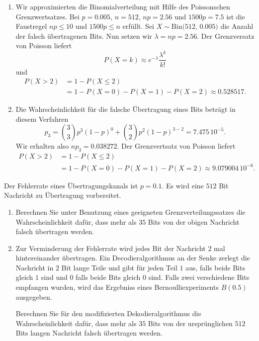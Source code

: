 \solution
\begin{enumerate}
    \item Wir approximierten die Binomialverteilung mit Hilfe des Poissonschen
        Grenzwertsatzes. Bei $p=0.005$, $n=512$, $np=2.56$ und $1500p = 7.5$
        ist die Faustregel $np \leq 10$ und $1500p\leq n$ erfüllt. Sei $X\sim
        \text{Bin(512, 0.005)}$ die Anzahl der falsch übertragenen Bits. Nun
        setzen wir $\lambda = np = 2.56$. Der Grenzversatz von Poisson liefert
        \begin{equation*}
            P(X=k) \approx e^{-\lambda } \frac{\lambda^{k}}{k!}
        \end{equation*}
        und
        \begin{align*}
            P\left( X>2 \right) &= 1 - P(X \leq 2) \\
            &= 1 - P(X=0)-P(X=1)-P(X=2) \approx 0.528517.
        \end{align*}
    \item Die Wahrscheinlichkeit für die falsche Übertragung eines Bits beträgt
        in diesem Verfahren
        \begin{equation*}
            p_3 = \binom{3}{3} p^{3}\left( 1-p \right)^{0} + \binom{3}{2} p^{2} \left( 1-p \right)^{3-2} = 7.475\, 10^{-5}.
        \end{equation*}
        Wir erhalten also $n p_3 = 0.038272$. Der Grenzvertsatz von Poisson liefert
        \begin{align*}
            P\left( X>2 \right) &= 1 - P(X \leq 2) \\
            &= 1 - P(X=0)-P(X=1)-P(X=2) \approx 9.079004\, 10^{-6}.
        \end{align*}
\end{enumerate}

 Der Fehlerrate
eines Übertragungskanals ist $p=0.1$. Es wird eine $512$ Bit Nachricht zu Übertragung
vorbereitet.
\begin{enumerate}
    \item Berechnen Sie unter Benutzung eines geeigneten Grenzverteilungssatzes
        die Wahrscheinlichkeit dafür, dass mehr als $35$ Bits von der obigen
        Nachricht falsch übertragen werden.

    \item Zur Verminderung der Fehlerrate wird jedes Bit der Nachricht $2$ mal
        hintereinander übertragen. Ein Decodieralgorithmus an der Senke zerlegt
        die Nachricht in $2$ Bit lange Teile und gibt für jeden Teil $1$ aus,
        falls beide Bits gleich $1$ sind und $0$ falls beide Bits gleich $0$
        sind.  Falls zwei verschiedene Bits empfangen wurden, wird das
        Ergebniss eines Bernoulliexperiments $B(0.5)$ ausgegeben. 
        
        Berechnen Sie für den modifizierten Dekodieralgorithmus die
        Wahrscheinlichkeit dafür, dass mehr als $35$ Bits von der
        ursprünglichen $512$ Bits langen Nachricht falsch übertragen werden.
\end{enumerate}



